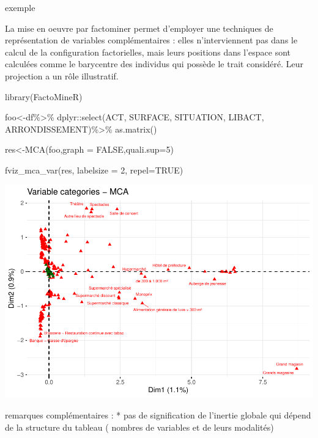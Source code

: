 \documentclass[
]{book}
\newenvironment{Shaded}{\begin{snugshade}}{\end{snugshade}}
\newcommand{\AttributeTok}[1]{\textcolor[rgb]{0.77,0.63,0.00}{#1}}
\newcommand{\ConstantTok}[1]{\textcolor[rgb]{0.00,0.00,0.00}{#1}}
\newcommand{\DecValTok}[1]{\textcolor[rgb]{0.00,0.00,0.81}{#1}}
\newcommand{\FunctionTok}[1]{\textcolor[rgb]{0.00,0.00,0.00}{#1}}
\newcommand{\NormalTok}[1]{#1}
\newcommand{\OtherTok}[1]{\textcolor[rgb]{0.56,0.35,0.01}{#1}}
\newcommand{\SpecialCharTok}[1]{\textcolor[rgb]{0.00,0.00,0.00}{#1}}
\begin{document}
exemple

La mise en oeuvre par factominer permet d'employer une techniques de représentation de variables complémentaires : elles n'interviennent pas dans le calcul de la configuration factorielles, mais leurs positions dans l'espace sont calculées comme le barycentre des individus qui possède le trait considéré. Leur projection a un rôle illustratif.

\begin{Shaded}
\begin{Highlighting}[]
\FunctionTok{library}\NormalTok{(FactoMineR)}

\NormalTok{foo}\OtherTok{\textless{}{-}}\NormalTok{df}\SpecialCharTok{\%\textgreater{}\%}\NormalTok{ dplyr}\SpecialCharTok{::}\FunctionTok{select}\NormalTok{(ACT, SURFACE, SITUATION, LIBACT, ARRONDISSEMENT)}\SpecialCharTok{\%\textgreater{}\%}
  \FunctionTok{as.matrix}\NormalTok{()}

\NormalTok{res}\OtherTok{\textless{}{-}}\FunctionTok{MCA}\NormalTok{(foo,}\AttributeTok{graph =} \ConstantTok{FALSE}\NormalTok{,}\AttributeTok{quali.sup=}\DecValTok{5}\NormalTok{)}

\FunctionTok{fviz\_mca\_var}\NormalTok{(res, }\AttributeTok{labelsize =} \DecValTok{2}\NormalTok{, }\AttributeTok{repel=}\ConstantTok{TRUE}\NormalTok{)}
\end{Highlighting}
\end{Shaded}

\includegraphics{bookdown-demo_files/figure-latex/0611-1.pdf}

remarques complémentaires :
* pas de signification de l'inertie globale qui dépend de la structure du tableau ( nombres de variables et de leurs modalités)
\end{document}
